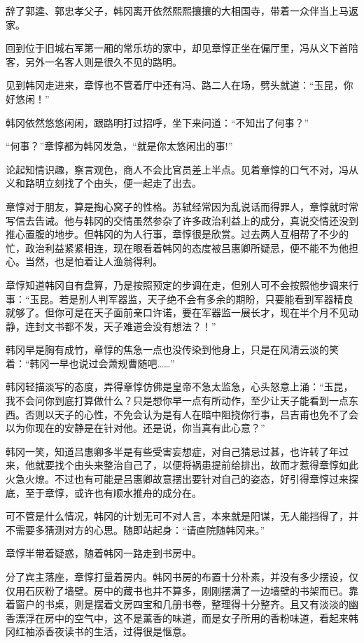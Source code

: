 辞了郭逵、郭忠孝父子，韩冈离开依然熙熙攘攘的大相国寺，带着一众伴当上马返家。

回到位于旧城右军第一厢的常乐坊的家中，却见章惇正坐在偏厅里，冯从义下首陪客，另外一名客人则是很久不见的路明。

见到韩冈走进来，章惇也不管着厅中还有冯、路二人在场，劈头就道：“玉昆，你好悠闲！”

韩冈依然悠悠闲闲，跟路明打过招呼，坐下来问道：“不知出了何事？”

“何事？”章惇都为韩冈发急，“就是你太悠闲出的事!”

论起知情识趣，察言观色，商人不会比官员差上半点。见着章惇的口气不对，冯从义和路明立刻找了个由头，便一起走了出去。

章惇对于朋友，算是掏心窝子的性格。苏轼经常因为乱说话而得罪人，章惇就时常写信去告诫。他与韩冈的交情虽然参杂了许多政治利益上的成分，真说交情还没到推心置腹的地步。但韩冈的为人行事，章惇很是欣赏。过去两人互相帮了不少的忙，政治利益紧紧相连，现在眼看着韩冈的态度被吕惠卿所疑忌，便不能不为他担心。当然，也是怕着让人渔翁得利。

章惇知道韩冈自有盘算，乃是按照预定的步调在走，但别人可不会按照他步调来行事：“玉昆。若是别人判军器监，天子绝不会有多余的期盼，只要能看到军器精良就够了。但你可是在天子面前亲口许诺，要在军器监一展长才，现在半个月不见动静，连封文书都不发，天子难道会没有想法？！”

韩冈早是胸有成竹，章惇的焦急一点也没传染到他身上，只是在风清云淡的笑着：“韩冈一早也说过会萧规曹随吧……”

韩冈轻描淡写的态度，弄得章惇仿佛是皇帝不急太监急，心头怒意上涌：“玉昆，我不会问你到底打算做什么？只是想你早一点有所动作，至少让天子能看到一点东西。否则以天子的心性，不免会认为是有人在暗中阻挠你行事，吕吉甫也免不了会以为你现在的安静是在针对他。还是说，你当真有此心意？”

韩冈一笑，知道吕惠卿多半是有些受害妄想症，对自己猜忌过甚，也许转了年过来，他就要找个由头来整治自己了，以便将祸患提前给排出，故而才惹得章惇如此火急火燎。不过也有可能是吕惠卿故意摆出要针对自己的姿态，好引得章惇过来探底，至于章惇，或许也有顺水推舟的成分在。

可不管是什么情况，韩冈的计划无可不对人言，本来就是阳谋，无人能挡得了，并不需要多猜测对方的心思。随即站起身：“请直院随韩冈来。”

章惇半带着疑惑，随着韩冈一路走到书房中。

分了宾主落座，章惇打量着房内。韩冈书房的布置十分朴素，并没有多少摆设，仅仅用石灰粉了墙壁。房中的藏书也并不算多，刚刚摆满了一边墙壁的书架而已。靠着窗户的书桌，则是摆着文房四宝和几册书卷，整理得十分整齐。且又有淡淡的幽香漂浮在房中的空气中，这不是薰香的味道，而是女子所用的香粉味道，看起来韩冈红袖添香夜读书的生活，过得很是惬意。

